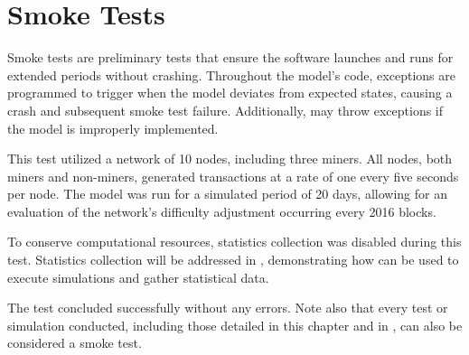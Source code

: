 \section{Smoke Tests}\label{sec:smoke-tests}

Smoke tests are preliminary tests that ensure the software launches and runs
for extended periods without crashing. Throughout the model's code, exceptions
are programmed to trigger when the model deviates from expected states, causing
a crash and subsequent smoke test failure. Additionally, \omnetpp{} may throw
exceptions if the model is improperly implemented.

This test utilized a network of 10 nodes, including three miners. All nodes,
both miners and non-miners, generated transactions at a rate of one every five
seconds per node. The model was run for a simulated period of 20 days, allowing
for an evaluation of the network's difficulty adjustment occurring every 2016
blocks.

To conserve computational resources, statistics collection was disabled during
this test. Statistics collection will be addressed in ,
demonstrating how \iblock{} can be used to execute simulations and gather
statistical data.

The test concluded successfully without any errors. Note also that every test
or simulation conducted, including those detailed in this chapter and in
, can also be considered a smoke test.
